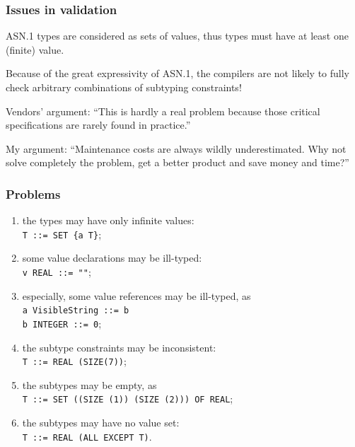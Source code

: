 \documentclass[compress,dvips,xcolor={dvipsnames},t]{beamer}
\newcommand\ASN{\textsf{ASN.1}\xspace}
\begin{document}
\begin{frame}
\frametitle{Issues in validation}

\ASN types are considered as sets of values, thus types must have at
least one (finite) value.

\bigskip

Because of the great expressivity of \ASN, the compilers are not
likely to fully check arbitrary combinations of subtyping
constraints!

\bigskip

Vendors' argument: ``This is hardly a real problem because
those critical specifications are rarely found in practice.''

\bigskip

My argument: ``Maintenance costs are always wildly underestimated. Why
not solve completely the problem, get a better product and save money
and time?''

\end{frame}


\begin{frame}
\frametitle{Problems}

\begin{enumerate}

  \item \label{finiteness} the types may have only infinite
        values:\\
        \texttt{T ::= SET \{a T\}};

  \item \label{type_conformance} some value declarations may be
        ill-typed:\\
        \texttt{v REAL ::= ""};

  \item \label{type_compatibility} especially, some value references
        may be ill-typed, as\\
        \texttt{a VisibleString ::= b}\\
        \texttt{b INTEGER ::= 0};

  \item \label{constraint_consistence} the subtype constraints may
        be inconsistent:\\
        \texttt{T ::= REAL (SIZE(7))};

  \item \label{subtype_non_emptyness} the subtypes may be empty, as\\
        \texttt{T ::= SET ((SIZE (1))  (SIZE (2))) OF REAL};

  \item \label{solvability} the subtypes may have no value set:\\
        \texttt{T ::= REAL (ALL EXCEPT T)}.

\end{enumerate}

\end{frame}
\end{document}
